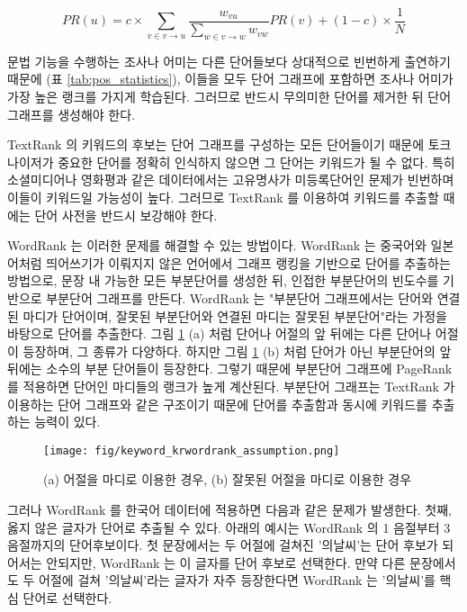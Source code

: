 \documentclass[oneside, ko,phd]{snuthesis_utf8_kor}
\begin{document}
\begin{equation}
\label{eq:textrank_pagerank}
PR(u) = c \times \sum_{v \in v \rightarrow u} \frac{w_{vu}}{\sum_{w \in v \rightarrow w} w_{vw}} PR(v) + (1-c) \times \frac{1}{N}
\end{equation}

문법 기능을 수행하는 조사나 어미는 다른 단어들보다 상대적으로 빈번하게 출연하기 때문에 (표 \ref{tab:pos_statistics}), 이들을 모두 단어 그래프에 포함하면 조사나 어미가 가장 높은 랭크를 가지게 학습된다.
그러므로 반드시 무의미한 단어를 제거한 뒤 단어 그래프를 생성해야 한다.

TextRank 의 키워드의 후보는 단어 그래프를 구성하는 모든 단어들이기 때문에 토크나이저가 중요한 단어를 정확히 인식하지 않으면 그 단어는 키워드가 될 수 없다.
특히 소셜미디어나 영화평과 같은 데이터에서는 고유명사가 미등록단어인 문제가 빈번하며 이들이 키워드일 가능성이 높다.
그러므로 TextRank 를 이용하여 키워드를 추출할 때에는 단어 사전을 반드시 보강해야 한다.

WordRank \cite{chen2011simple} 는 이러한 문제를 해결할 수 있는 방법이다.
WordRank 는 중국어와 일본어처럼 띄어쓰기가 이뤄지지 않은 언어에서 그래프 랭킹을 기반으로 단어를 추출하는 방법으로, 문장 내 가능한 모든 부분단어를 생성한 뒤, 인접한 부분단어의 빈도수를 기반으로 부분단어 그래프를 만든다.
WordRank 는 "부분단어 그래프에서는 단어와 연결된 마디가 단어이며, 잘못된 부분단어와 연결된 마디는 잘못된 부분단어"라는 가정을 바탕으로 단어를 추출한다.
그림 \ref{fig:keyword_krwordrank_assumption} (a) 처럼 단어나 어절의 앞 뒤에는 다른 단어나 어절이 등장하며, 그 종류가 다양하다.
하지만 그림 \ref{fig:keyword_krwordrank_assumption} (b) 처럼 단어가 아닌 부분단어의 앞 뒤에는 소수의 부분 단어들이 등장한다.
그렇기 때문에 부분단어 그래프에 PageRank 를 적용하면 단어인 마디들의 랭크가 높게 계산된다.
부분단어 그래프는 TextRank 가 이용하는 단어 그래프와 같은 구조이기 때문에 단어를 추출함과 동시에 키워드를 추출하는 능력이 있다.

\begin{figure}[H]
\centering
\texttt{[image: fig/keyword\_krwordrank\_assumption.png]}
\caption{(a) 어절을 마디로 이용한 경우, (b) 잘못된 어절을 마디로 이용한 경우}
\label{fig:keyword_krwordrank_assumption}
\end{figure}

그러나 WordRank 를 한국어 데이터에 적용하면 다음과 같은 문제가 발생한다.
첫째, 옳지 않은 글자가 단어로 추출될 수 있다.
아래의 예시는 WordRank 의 1 음절부터 3 음절까지의 단어후보이다.
첫 문장에서는 두 어절에 걸쳐진 '의날씨'는 단어 후보가 되어서는 안되지만, WordRank 는 이 글자를 단어 후보로 선택한다.
만약 다른 문장에서도 두 어절에 걸쳐 '의날씨'라는 글자가 자주 등장한다면 WordRank 는 '의날씨'를 핵심 단어로 선택한다.
\end{document}
